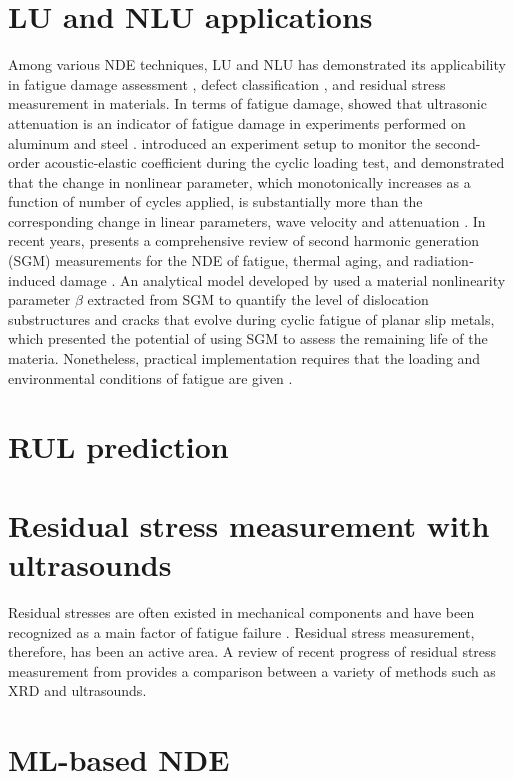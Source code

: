 \section{LU and NLU applications}
Among various NDE techniques, LU and NLU has demonstrated its applicability in fatigue damage assessment \cite{nde-lu-fatigue-JOSHI1972577, nde-nlu-fatigue-NAGY1998375,nde-nlu-review-Matlack2014, nde-nlu-fatigue-Cantrell}, defect classification \cite{nde-lu-ml-defect-Sambath2011}, and residual stress measurement \cite{nde-lu-rs-review-RUUD198215, nde-lu-rs-Man1987, nde-lu-rs-dike} in materials. In terms of fatigue damage,  showed that ultrasonic attenuation is an indicator of fatigue damage in experiments performed on aluminum and steel \cite{nde-lu-fatigue-JOSHI1972577}.  introduced an experiment setup to monitor the second-order acoustic-elastic coefficient during the cyclic loading test, and demonstrated that the change in nonlinear parameter, which monotonically increases as a function of number of cycles applied, is substantially more than the corresponding change in linear parameters, wave velocity and attenuation \cite{nde-nlu-fatigue-NAGY1998375}. In recent years,  presents a comprehensive review of second harmonic generation (SGM) measurements for the NDE of fatigue, thermal aging, and radiation‐induced damage \cite{nde-nlu-review-Matlack2014}. An analytical model developed by  used a material nonlinearity parameter $ \beta $ extracted from SGM to quantify the level of dislocation substructures and cracks that evolve during cyclic fatigue of planar slip metals, which presented the potential of using SGM to assess the remaining life of the materia. Nonetheless, practical implementation requires that the loading and environmental conditions of fatigue are given \cite{nde-nlu-fatigue-Cantrell}.

\section{RUL prediction}
\section{Residual stress measurement with ultrasounds}
Residual stresses are often existed in mechanical components and have been recognized as a main factor of fatigue failure \cite{rs-fatigue-WEBSTER2001375}. Residual stress measurement, therefore, has been an active area. A review of recent progress of residual stress measurement from  provides a comparison between a variety of methods such as XRD and ultrasounds.


\section{ML-based NDE}